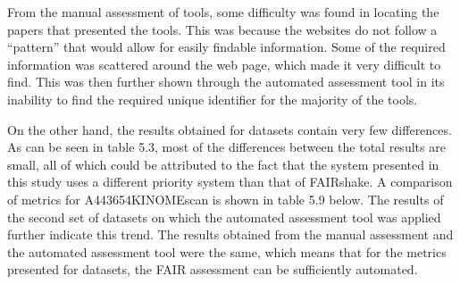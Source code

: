 \documentclass{cisfyp}
\begin{document}
From the manual assessment of tools, some difficulty was found in locating the papers that presented the tools. This was because the websites do not follow a ``pattern'' that would allow for easily findable information. Some of the required information was scattered around the web page, which made it very difficult to find. This was then further shown through the automated assessment tool in its inability to find the required unique identifier for the majority of the tools. 

On the other hand, the results obtained for datasets contain very few differences. As can be seen in table 5.3, most of the differences between the total results are small, all of which could be attributed to the fact that the system presented in this study uses a different priority system than that of FAIRshake. A comparison of metrics for A443654KINOMEscan is shown in table 5.9 below. The results of the second set of datasets on which the automated assessment tool was applied further indicate this trend. The results obtained from the manual assessment and the automated assessment tool were the same, which means that for the metrics presented for datasets, the FAIR assessment can be sufficiently automated.
\end{document}
